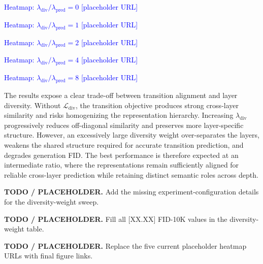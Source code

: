 \documentclass[10pt,letterpaper]{article}
\begin{document}
\begin{todobox}

\textcolor{blue}{Heatmap: \(\lambda_{\mathrm{div}}/\lambda_{\mathrm{pred}}=0\)  [placeholder URL]}\par

\textcolor{blue}{Heatmap: \(\lambda_{\mathrm{div}}/\lambda_{\mathrm{pred}}=1\)  [placeholder URL]}\par

\textcolor{blue}{Heatmap: \(\lambda_{\mathrm{div}}/\lambda_{\mathrm{pred}}=2\)  [placeholder URL]}\par

\textcolor{blue}{Heatmap: \(\lambda_{\mathrm{div}}/\lambda_{\mathrm{pred}}=4\)  [placeholder URL]}\par

\textcolor{blue}{Heatmap: \(\lambda_{\mathrm{div}}/\lambda_{\mathrm{pred}}=8\)  [placeholder URL]}\par

\end{todobox}

\begin{answerbox}

The results expose a clear trade-off between transition alignment and layer diversity. Without \(\mathcal{L}_{\mathrm{div}}\), the transition objective produces strong cross-layer similarity and risks homogenizing the representation hierarchy. Increasing \(\lambda_{\mathrm{div}}\) progressively reduces off-diagonal similarity and preserves more layer-specific structure. However, an excessively large diversity weight over-separates the layers, weakens the shared structure required for accurate transition prediction, and degrades generation FID. The best performance is therefore expected at an intermediate ratio, where the representations remain sufficiently aligned for reliable cross-layer prediction while retaining distinct semantic roles across depth.


\end{answerbox}

\begin{todobox}

\textbf{\textcolor{todored}{TODO / PLACEHOLDER.}} Add the missing experiment-configuration details for the diversity-weight sweep.\par

\textbf{\textcolor{todored}{TODO / PLACEHOLDER.}} Fill all [XX.XX] FID-10K values in the diversity-weight table.\par

\textbf{\textcolor{todored}{TODO / PLACEHOLDER.}} Replace the five current placeholder heatmap URLs with final figure links.\par

\end{todobox}
\end{document}
